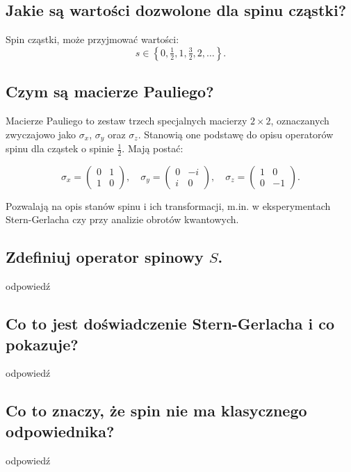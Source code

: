 \subsection{Jakie są wartości dozwolone dla spinu cząstki?}

Spin cząstki, może przyjmować wartości:
\[
s \in \left\{ 0, \tfrac{1}{2}, 1, \tfrac{3}{2}, 2, \dots \right\}.
\]

\subsection{Czym są macierze Pauliego?}

Macierze Pauliego to zestaw trzech specjalnych macierzy \( 2 \times 2 \), oznaczanych zwyczajowo jako \( \sigma_x \), \( \sigma_y \) oraz \( \sigma_z \). Stanowią one podstawę do opisu operatorów spinu dla cząstek o spinie \( \frac{1}{2} \). Mają postać:

\[
\sigma_x = \begin{pmatrix}
0 & 1 \\
1 & 0
\end{pmatrix}, \quad
\sigma_y = \begin{pmatrix}
0 & -i \\
i & 0
\end{pmatrix}, \quad
\sigma_z = \begin{pmatrix}
1 & 0 \\
0 & -1
\end{pmatrix}.
\]

Pozwalają na opis stanów spinu i ich transformacji, m.in. w eksperymentach Stern-Gerlacha czy przy analizie obrotów kwantowych.

\subsection{Zdefiniuj operator spinowy $S$.}

odpowiedź

\subsection{Co to jest doświadczenie Stern-Gerlacha i co pokazuje?}

odpowiedź

\subsection{Co to znaczy, że spin nie ma klasycznego odpowiednika?}

odpowiedź

